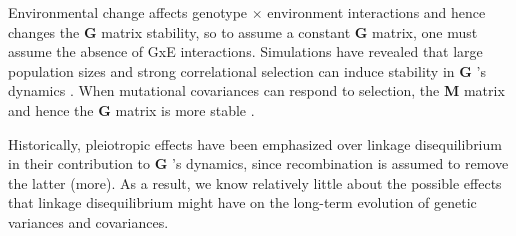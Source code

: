 \documentclass[9pt,twocolumn,twoside]{gsajnl}
\newcommand{\G}{\textbf{G }}
\newcommand{\M}{\textbf{M }}
\begin{document}
Environmental change affects genotype $\times$ environment interactions and hence changes the \G matrix stability, so to assume a constant \G matrix, one must assume the absence of GxE interactions. Simulations have revealed that large population sizes and strong correlational selection can induce stability in \G's dynamics \cite{Jones2003}. When mutational covariances can respond to selection, the \M matrix and hence the \G matrix is more stable \cite{Jones2007}. 

Historically, pleiotropic effects have been emphasized over linkage disequilibrium in their contribution to \G's dynamics, since recombination is assumed to remove the latter \citep{lande1979quantitative,lande1980genetic,Arnold2008} (more). As a result, we know relatively little about the possible effects that linkage disequilibrium might have on the long-term evolution of genetic variances and covariances.
% 
% 
% 
% 
% 
% 
% 
\end{document}
